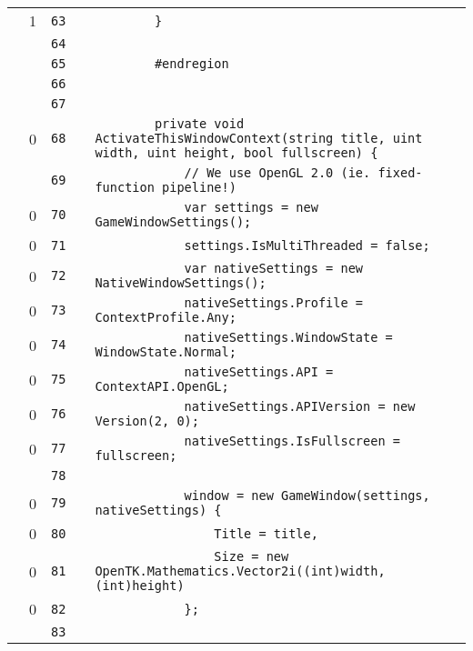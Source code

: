 \documentclass[a4paper,landscape,10pt]{article}
\begin{document}
\begin{longtable}[l]{lrrll}
\cellcolor{green} & 1 & \verb~63~ & & \verb~        }~\\
\cellcolor{gray} &  & \verb~64~ & & \verb~~\\
\cellcolor{gray} &  & \verb~65~ & & \verb~        #endregion~\\
\cellcolor{gray} &  & \verb~66~ & & \verb~~\\
\cellcolor{gray} &  & \verb~67~ & & \verb~~\\
\cellcolor{red} & 0 & \verb~68~ & & \verb~        private void ActivateThisWindowContext(string title, uint width, uint height, bool fullscreen) {~\\
\cellcolor{gray} &  & \verb~69~ & & \verb~            // We use OpenGL 2.0 (ie. fixed-function pipeline!)~\\
\cellcolor{red} & 0 & \verb~70~ & & \verb~            var settings = new GameWindowSettings();~\\
\cellcolor{red} & 0 & \verb~71~ & & \verb~            settings.IsMultiThreaded = false;~\\
\cellcolor{red} & 0 & \verb~72~ & & \verb~            var nativeSettings = new NativeWindowSettings();~\\
\cellcolor{red} & 0 & \verb~73~ & & \verb~            nativeSettings.Profile = ContextProfile.Any;~\\
\cellcolor{red} & 0 & \verb~74~ & & \verb~            nativeSettings.WindowState = WindowState.Normal;~\\
\cellcolor{red} & 0 & \verb~75~ & & \verb~            nativeSettings.API = ContextAPI.OpenGL;~\\
\cellcolor{red} & 0 & \verb~76~ & & \verb~            nativeSettings.APIVersion = new Version(2, 0);~\\
\cellcolor{red} & 0 & \verb~77~ & & \verb~            nativeSettings.IsFullscreen = fullscreen;~\\
\cellcolor{gray} &  & \verb~78~ & & \verb~~\\
\cellcolor{red} & 0 & \verb~79~ & & \verb~            window = new GameWindow(settings, nativeSettings) {~\\
\cellcolor{red} & 0 & \verb~80~ & & \verb~                Title = title,~\\
\cellcolor{red} & 0 & \verb~81~ & & \verb~                Size = new OpenTK.Mathematics.Vector2i((int)width, (int)height)~\\
\cellcolor{red} & 0 & \verb~82~ & & \verb~            };~\\
\cellcolor{gray} &  & \verb~83~ & & \verb~~\\

\end{longtable}
\end{document}
